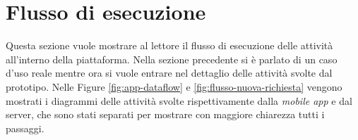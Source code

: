 

\section{Flusso di esecuzione\label{sec:flusso-richiesta}}

Questa sezione vuole mostrare al lettore il flusso di esecuzione delle attività all'interno della piattaforma. Nella sezione precedente si è parlato di un caso d'uso reale mentre ora si vuole entrare nel dettaglio delle attività svolte dal prototipo. Nelle Figure \ref{fig:app-dataflow} e \ref{fig:flusso-nuova-richiesta} vengono mostrati i diagrammi delle attività svolte rispettivamente dalla \emph{mobile app} e dal server, che sono stati separati per mostrare con maggiore chiarezza tutti i passaggi.



